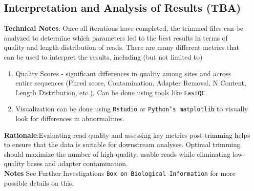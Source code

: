 \documentclass[11pt]{report}
\begin{document}
\subsection{Interpretation and Analysis of Results (TBA)}
\textbf{Technical Notes}: Once all iterations have completed, the trimmed files can be analyzed to determine which parameters led to the best results in terms of quality and length distribution of reads. There are many different metrics that can be used to interpret the results, including (but not limited to)
\begin{enumerate}
	\item Quality Scores - significant differences in quality among sites and across entire sequences (Phred score, Contamination, Adapter Removal, N Content, Length Distribution, etc.). Can be done using tools like \texttt{FastQC}
	\item Visualization can be done using \texttt{Rstudio} or \texttt{Python's matplotlib} to visually look for differences in abnormalities. 
\end{enumerate} 
\textbf{Rationale}:Evaluating read quality and assessing key metrics post-trimming helps to ensure that the data is suitable for downstream analyses. Optimal trimming should maximize the number of high-quality, usable reads while eliminating low-quality bases and adapter contamination.\\ 
\textbf{Notes} See Further Investigations \texttt{Box on Biological Information} for more possible details on this. 
\end{document}
